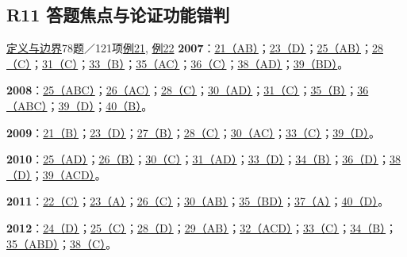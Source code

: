 \documentclass[11pt,a4paper]{article}
\begin{document}
\subsection{R11 答题焦点与论证功能错判}\label{class-R11}
\noindent \hyperref[cat-R11]{定义与边界}\quad 78题／121项\quad \hyperref[case-2007-T1-Q21]{例21}, \hyperref[case-2012-T3-Q35]{例22}
\noindent\textbf{2007}：\hyperref[idx-2007-T1-Q21]{21（AB）}；\hyperref[idx-2007-T1-Q23]{23（D）}；\hyperref[idx-2007-T1-Q25]{25（AB）}；\hyperref[idx-2007-T2-Q28]{28（C）}；\hyperref[idx-2007-T3-Q31]{31（C）}；\hyperref[idx-2007-T3-Q33]{33（B）}；\hyperref[idx-2007-T3-Q35]{35（AC）}；\hyperref[idx-2007-T4-Q36]{36（C）}；\hyperref[idx-2007-T4-Q38]{38（AD）}；\hyperref[idx-2007-T4-Q39]{39（BD）}。\par
\noindent\textbf{2008}：\hyperref[idx-2008-T1-Q25]{25（ABC）}；\hyperref[idx-2008-T2-Q26]{26（AC）}；\hyperref[idx-2008-T2-Q28]{28（C）}；\hyperref[idx-2008-T2-Q30]{30（AD）}；\hyperref[idx-2008-T3-Q31]{31（C）}；\hyperref[idx-2008-T3-Q35]{35（B）}；\hyperref[idx-2008-T4-Q36]{36（ABC）}；\hyperref[idx-2008-T4-Q39]{39（D）}；\hyperref[idx-2008-T4-Q40]{40（B）}。\par
\noindent\textbf{2009}：\hyperref[idx-2009-T1-Q21]{21（B）}；\hyperref[idx-2009-T1-Q23]{23（D）}；\hyperref[idx-2009-T2-Q27]{27（B）}；\hyperref[idx-2009-T2-Q28]{28（C）}；\hyperref[idx-2009-T2-Q30]{30（AC）}；\hyperref[idx-2009-T3-Q33]{33（C）}；\hyperref[idx-2009-T4-Q39]{39（D）}。\par
\noindent\textbf{2010}：\hyperref[idx-2010-T1-Q25]{25（AD）}；\hyperref[idx-2010-T2-Q26]{26（B）}；\hyperref[idx-2010-T2-Q30]{30（C）}；\hyperref[idx-2010-T3-Q31]{31（AD）}；\hyperref[idx-2010-T3-Q33]{33（D）}；\hyperref[idx-2010-T3-Q34]{34（B）}；\hyperref[idx-2010-T4-Q36]{36（D）}；\hyperref[idx-2010-T4-Q38]{38（D）}；\hyperref[idx-2010-T4-Q39]{39（ACD）}。\par
\noindent\textbf{2011}：\hyperref[idx-2011-T1-Q22]{22（C）}；\hyperref[idx-2011-T1-Q23]{23（A）}；\hyperref[idx-2011-T2-Q26]{26（C）}；\hyperref[idx-2011-T2-Q30]{30（AB）}；\hyperref[idx-2011-T3-Q35]{35（BD）}；\hyperref[idx-2011-T4-Q37]{37（A）}；\hyperref[idx-2011-T4-Q40]{40（D）}。\par
\noindent\textbf{2012}：\hyperref[idx-2012-T1-Q24]{24（D）}；\hyperref[idx-2012-T1-Q25]{25（C）}；\hyperref[idx-2012-T2-Q28]{28（D）}；\hyperref[idx-2012-T2-Q29]{29（AB）}；\hyperref[idx-2012-T3-Q32]{32（ACD）}；\hyperref[idx-2012-T3-Q33]{33（C）}；\hyperref[idx-2012-T3-Q34]{34（B）}；\hyperref[idx-2012-T3-Q35]{35（ABD）}；\hyperref[idx-2012-T4-Q38]{38（C）}。\par
\end{document}
